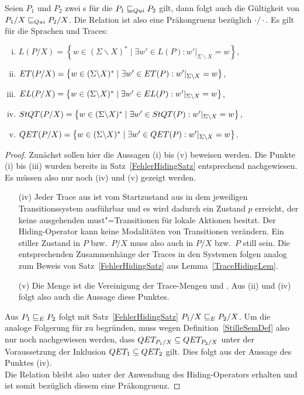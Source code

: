 \begin{Satz}
  \label{StilleHidingSatz}
  Seien $P_1$ und $P_2$ zwei \MEIO{}s für die $P_1 \sqsubseteq  _{Qui} P_2$ gilt, dann folgt
  auch die Gültigkeit von $P_1/X \sqsubseteq  _{Qui} P_2/X$. Die Relation \QRel{} ist also
  eine Präkongruenz bezüglich $\cdot /\cdot$. Es gilt für die Sprachen und
  Traces:
  \begin{enumerate}[(i)]
    \item $L(P/X) = \left\{w\in (\Sigma\backslash X)^*\mid \exists w'\in L(P):
      w'|_{\Sigma\backslash X} = w\right\}$,
    \item $ET (P/X) = \left\{w\in (\Sigma\backslash X)^*\mid \exists w'\in
      ET(P): w'|_{\Sigma\backslash X} = w\right\}$,
    \item $EL (P/X) = \left\{w\in (\Sigma\backslash X)^*\mid \exists w'\in
      EL(P): w'|_{\Sigma\backslash X} = w\right\}$,
    \item $StQT (P/X) = \left\{w\in (\Sigma\backslash X)^*\mid \exists w'\in
      StQT(P): w'|_{\Sigma\backslash X} = w\right\}$,
    \item $QET (P/X) = \left\{w\in (\Sigma\backslash X)^*\mid \exists w'\in
      QET(P): w'|_{\Sigma\backslash X} = w\right\}$.
  \end{enumerate}
\end{Satz}
\begin{proof}
  Zunächst sollen hier die Aussagen (i) bis (v) beweisen werden. Die Punkte
  (i) bis (iii) wurden bereits in Satz~\ref{FehlerHidingSatz} entsprechend
  nachgewiesen. Es müssen also nur noch (iv) und (v) gezeigt werden.
  \begin{itemize}
    \item[(iv)] Jeder Trace aus \StQT{} ist vom Startzustand aus in dem
      jeweiligen Transitionssystem ausführbar und es wird dadurch ein Zustand
      $p$ erreicht, der keine ausgehenden must"=Transitionen für lokale
      Aktionen besitzt. Der Hiding-Operator kann keine Modalitäten von
      Transitionen verändern. Ein stiller Zustand in $P$ bzw.\ $P/X$ muss also
      auch in $P/X$ bzw.\ $P$ still sein. Die entsprechenden Zusammenhänge der
      Traces in den Systemen folgen analog zum Beweis von
      Satz~\ref{FehlerHidingSatz} aus Lemma~\ref{TraceHidingLem}.
    \item[(v)] Die Menge \QET{} ist die Vereinigung der Trace-Mengen \ET{} und
      \StQT{}. Aus (ii) und (iv) folgt also auch die Aussage diese Punktes.
  \end{itemize}
  Aus $P_1 \sqsubseteq  _E P_2$ folgt mit Satz~\ref{FehlerHidingSatz} $P_1/X \sqsubseteq  _E P_2/X$.
  Um die analoge Folgerung für \QRel{} zu begründen, muss wegen
  Definition~\ref{StilleSemDef} also nur noch nachgewiesen werden, dass $QET
  _{P_1/X} \subseteq QET _{P_2/X}$ unter der Voraussetzung der Inklusion $QET
  _1 \subseteq QET _2$ gilt. Dies folgt aus der Aussage des Punktes (iv).\\
  Die Relation \QRel{} bleibt also unter der Anwendung des Hiding-Operators
  erhalten und ist somit bezüglich diesem eine Präkongruenz.
\end{proof}


